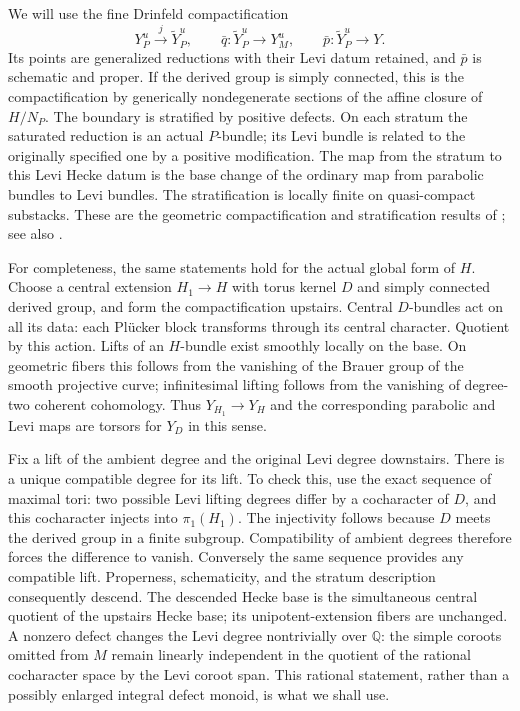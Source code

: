 We will use the fine Drinfeld compactification
\[
 Y_P^u\xrightarrow{\ j\ }\widetilde Y_P^u,
 \qquad \bar q:\widetilde Y_P^u\longrightarrow Y_M^u,
 \qquad \bar p:\widetilde Y_P^u\longrightarrow Y.
\]
Its points are generalized reductions with their Levi datum retained, and
$\bar p$ is schematic and proper.  If the derived group is simply connected,
this is the compactification by generically nondegenerate sections of the
affine closure of $H/N_P$.  The boundary is stratified by positive defects.
On each stratum the saturated reduction is an actual $P$-bundle; its Levi
bundle is related to the originally specified one by a positive
modification.  The map from the stratum to this Levi Hecke datum is the
base change of the ordinary map from parabolic bundles to Levi bundles.
The stratification is locally finite on quasi-compact substacks.  These are
the geometric compactification and stratification results of
\cite{BravermanGaitsgory}; see also
\cite[Sections~3.2--3.3]{SchiederVinberg}.

For completeness, the same statements hold for the actual global form of
$H$.  Choose a central extension $H_1\to H$ with torus kernel $D$ and simply
connected derived group, and form the compactification upstairs.  Central
$D$-bundles act on all its data: each Pl\"ucker block transforms through its
central character.  Quotient by this action.  Lifts of an $H$-bundle exist
smoothly locally on the base.  On geometric fibers this follows from the
vanishing of the Brauer group of the smooth projective curve; infinitesimal
lifting follows from the vanishing of degree-two coherent cohomology.
Thus $Y_{H_1}\to Y_H$ and the corresponding parabolic and Levi maps are
torsors for $Y_D$ in this sense.

Fix a lift of the ambient degree and the original Levi degree downstairs.
There is a unique compatible degree for its lift.  To check this, use the
exact sequence of maximal tori: two possible Levi lifting degrees differ
by a cocharacter of $D$, and this cocharacter injects into $\pi_1(H_1)$.
The injectivity follows because $D$ meets the derived group in a finite
subgroup.  Compatibility of ambient degrees therefore forces the difference
to vanish.  Conversely the same sequence provides any compatible lift.
Properness, schematicity, and the stratum description consequently descend.
The descended Hecke base is the simultaneous central quotient of the
upstairs Hecke base; its unipotent-extension fibers are unchanged.  A
nonzero defect changes the Levi degree nontrivially over $\mathbb Q$: the
simple coroots omitted from $M$ remain linearly independent in the quotient
of the rational cocharacter space by the Levi coroot span.  This rational
statement, rather than a possibly enlarged integral defect monoid, is what
we shall use.

